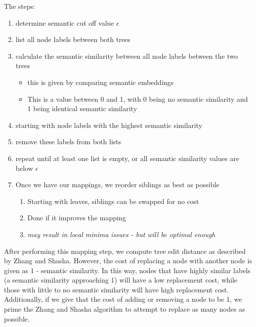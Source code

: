 The steps:
\begin{enumerate}
    \item determine semantic cut off value $\epsilon$
    \item list all node labels between both trees
    \item calculate the semantic similarity between all node labels between the two trees
          \begin{itemize}
              \item this is given by comparing semantic embeddings
              \item This is a value between 0 and 1, with 0 being no semantic similarity and 1 being identical semantic similarity
          \end{itemize}
    \item starting with node labels with the highest semantic similarity
    \item remove these labels from both lists
    \item repeat until at least one list is empty, or all semantic similarity values are below $\epsilon$
\item Once we have our mappings, we reorder siblings as best as possible
\begin{enumerate}
    \item Starting with leaves, siblings can be swapped for no cost
    \item Done if it improves the mapping
    \item \textit{may result in local minima issues - but will be optimal enough}
\end{enumerate}
\end{enumerate}

After performing this mapping step, we compute tree edit distance as described by Zhang and Shasha. However, the cost of replacing a node with another node is given as 1 - semantic similarity. In this way, nodes that have highly similar labels (a semantic similarity approaching 1) will have a low replacement cost, while those with little to no semantic similarity will have high replacement cost. Additionally, if we give that the cost of adding or removing a node to be 1, we prime the Zhang and Shasha algorithm to attempt to replace as many nodes as possible. 

